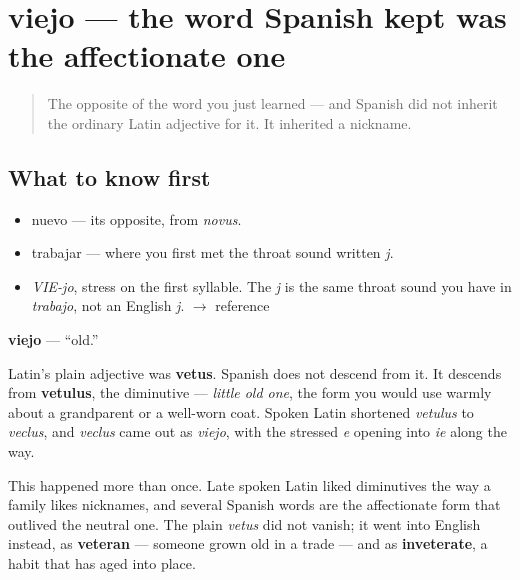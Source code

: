 \section[viejo]{viejo — the word Spanish kept was the affectionate one}

\label{lesson:ES-C281-viejo}



\begin{quote}
The opposite of the word you just learned — and Spanish did not inherit the ordinary Latin adjective for it. It inherited a nickname.
\end{quote}

\subsection*{What to know first}
\begin{itemize}
\raggedright
  \item nuevo — its opposite, from \emph{novus}.
  \item trabajar — where you first met the throat sound written \emph{j}.
\end{itemize}

\begin{sounds}
\begin{itemize}
\raggedright
  \item \emph{VIE-jo}, stress on the first syllable. The \emph{j} is the same throat sound you have in \emph{trabajo}, not an English \emph{j}. $\to$ reference
\end{itemize}
\end{sounds}

\begin{cousinweb}
\textbf{viejo} — \textquotedblleft{}old.\textquotedblright{}

Latin's plain adjective was \textbf{vetus}. Spanish does not descend from it. It descends from \textbf{vetulus}, the diminutive — \emph{little old one}, the form you would use warmly about a grandparent or a well-worn coat. Spoken Latin shortened \emph{vetulus} to \emph{veclus}, and \emph{veclus} came out as \emph{viejo}, with the stressed \emph{e} opening into \emph{ie} along the way.

This happened more than once. Late spoken Latin liked diminutives the way a family likes nicknames, and several Spanish words are the affectionate form that outlived the neutral one. The plain \emph{vetus} did not vanish; it went into English instead, as \textbf{veteran} — someone grown old in a trade — and as \textbf{inveterate}, a habit that has aged into place.
\end{cousinweb}

